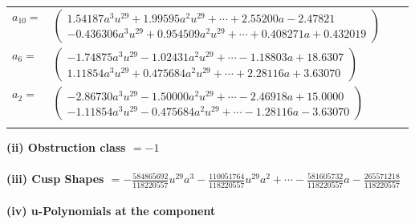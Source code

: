 \documentclass[1p]{elsarticle_modified}
\theoremstyle{definition}
\begin{document}
\begin{tabular}{m{7pt} m{180pt} m{7pt} m{180pt} }
\flushright $a_{10}=$&$\begin{pmatrix}1.54187 a^{3} u^{29}+1.99595 a^{2} u^{29}+\cdots+2.55200 a-2.47821\\-0.436306 a^{3} u^{29}+0.954509 a^{2} u^{29}+\cdots+0.408271 a+0.432019\end{pmatrix}$ \\
\flushright $a_{6}=$&$\begin{pmatrix}-1.74875 a^{3} u^{29}-1.02431 a^{2} u^{29}+\cdots-1.18803 a+18.6307\\1.11854 a^{3} u^{29}+0.475684 a^{2} u^{29}+\cdots+2.28116 a+3.63070\end{pmatrix}$ \\
\flushright $a_{2}=$&$\begin{pmatrix}-2.86730 a^{3} u^{29}-1.50000 a^{2} u^{29}+\cdots-2.46918 a+15.0000\\-1.11854 a^{3} u^{29}-0.475684 a^{2} u^{29}+\cdots-1.28116 a-3.63070\end{pmatrix}$\\&\end{tabular}
\flushleft \textbf{(ii) Obstruction class $= -1$}\\~\\
\flushleft \textbf{(iii) Cusp Shapes $= -\frac{584865692}{118220557} u^{29} a^3-\frac{110051764}{118220557} u^{29} a^2+\cdots-\frac{581605732}{118220557} a-\frac{265571218}{118220557}$}\\~\\
\newpage\renewcommand{\arraystretch}{1}
\flushleft \textbf{(iv) u-Polynomials at the component}\newline \\
\end{document}
